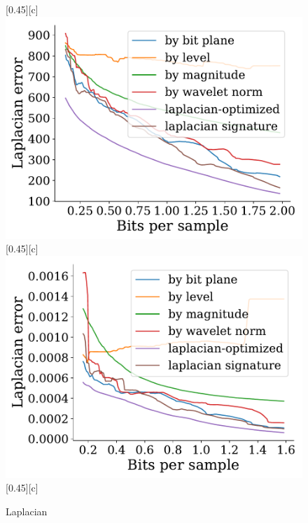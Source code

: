 \documentclass{article}
\begin{document}
\begin{figure}[htb]
        [0.45\linewidth][c]{%
                \includegraphics[width=0.4\linewidth]{img/supplementary/laplacian-optimized-foam}}
        [0.45\linewidth][c]{%
                \includegraphics[width=0.4\linewidth]{img/supplementary/laplacian-optimized-karfs}}
        [0.45\linewidth][c]{%
                }
        \caption{Laplacian}
\end{figure}
\end{document}
